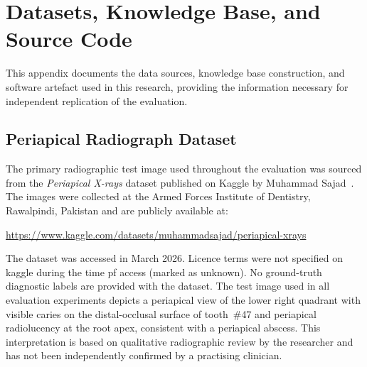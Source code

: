 \documentclass[12pt,a4paper]{report}
\begin{document}
	




\appendix

\chapter{Datasets, Knowledge Base, and Source Code}
\label{app:datasets}

This appendix documents the data sources, knowledge base construction, and
software artefact used in this research, providing the information necessary
for independent replication of the evaluation.

\section{Periapical Radiograph Dataset}

The primary radiographic test image used throughout the evaluation was sourced
from the \textit{Periapical X-rays} dataset published on Kaggle by Muhammad
Sajad~\cite{kaggle_periapical_sajad}. The images were collected at the Armed
Forces Institute of Dentistry, Rawalpindi, Pakistan and are publicly available
at:

\begin{center}
\url{https://www.kaggle.com/datasets/muhammadsajad/periapical-xrays}
\end{center}

The dataset was accessed in March 2026. Licence terms were not specified on kaggle during the time pf access (marked as unknown). No ground-truth diagnostic labels
are provided with the dataset. The test image used in all evaluation experiments
depicts a periapical view of the lower right quadrant with visible caries on the
distal-occlusal surface of tooth~\#47 and periapical radiolucency at the root
apex, consistent with a periapical abscess. This interpretation is based on
qualitative radiographic review by the researcher and has not been independently
confirmed by a practising clinician.
\end{document}
